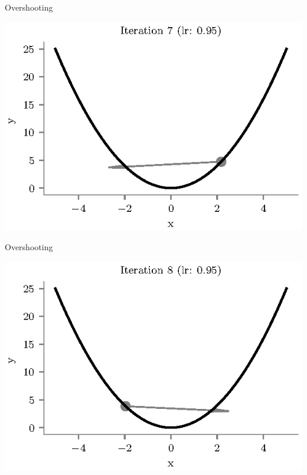 \documentclass{beamer}
\begin{document}
\begin{frame}{Overshooting}
\begin{center}
\includegraphics[totalheight=6cm]{gradient-descent/overshooting-7.eps}
\end{center}
\end{frame}

\begin{frame}{Overshooting}
\begin{center}
\includegraphics[totalheight=6cm]{gradient-descent/overshooting-8.eps}
\end{center}
\end{frame}
\end{document}
